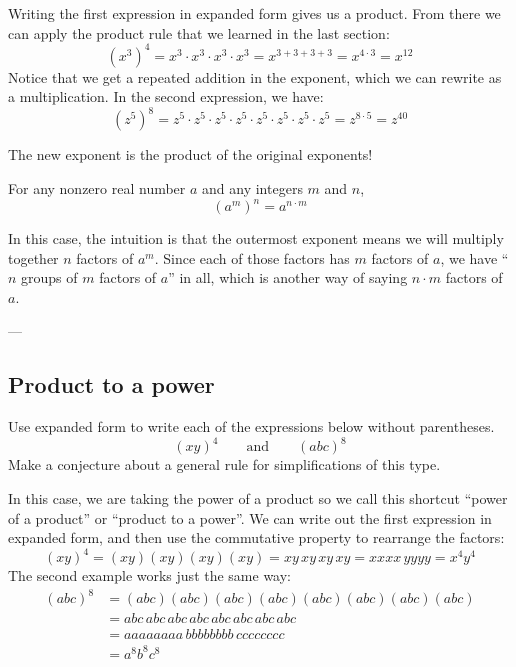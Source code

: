 Writing the first expression in expanded form gives us a product. From there we can apply the product rule that we learned in the last section:
\[(x^3)^4 = x^3 \cdot x^3 \cdot x^3 \cdot x^3 = x^{3+3+3+3} = x^{4\cdot3} = x^{12}\]
Notice that we get a repeated addition in the exponent, which we can rewrite as a multiplication. In the second expression, we have:
\[(z^5)^8 = z^5 \cdot z^5 \cdot z^5 \cdot z^5 \cdot z^5 \cdot z^5 \cdot z^5 \cdot z^5 = z^{8\cdot5} = z^{40}\]

The new exponent is the product of the original exponents!

\begin{boxdef}
For any nonzero real number $a$ and any integers $m$ and $n$, \[(a^m)^n = a^{n \cdot m}\]
\end{boxdef}

In this case, the intuition is that the outermost exponent means we will multiply together $n$ factors of $a^m$. Since each of those factors has $m$ factors of $a$, we have ``$n$ groups of $m$ factors of $a$'' in all, which is another way of saying $n \cdot m$ factors of $a$.

\begin{boxex}
---
\end{boxex}


\subsection{Product to a power}

\begin{boxexplore}[Derivation \#3]
Use expanded form to write each of the expressions below without parentheses.
\[(xy)^4 \qquad\text{and}\qquad (abc)^8\]
Make a conjecture about a general rule for simplifications of this type.
\end{boxexplore}

In this case, we are taking the power of a product so we call this shortcut ``power of a product'' or ``product to a power''. We can write out the first expression in expanded form, and then use the commutative property to rearrange the factors:
\[(xy)^4 = (xy)(xy)(xy)(xy) = xy\,xy\,xy\,xy = xxxx\,yyyy = x^4y^4\]
The second example works just the same way:
\[
\begin{aligned}(abc)^8 &= (abc)(abc)(abc)(abc)(abc)(abc)(abc)(abc)
\\ &= abc\,abc\,abc\,abc\,abc\,abc\,abc\,abc
\\ &= aaaaaaaa\,bbbbbbbb\,cccccccc
\\ &= a^8b^8c^8
\end{aligned}\]

